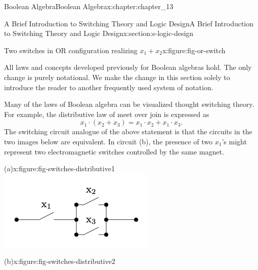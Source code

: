 \documentclass[oneside,10pt,]{book}
\numberwithin{equation}{section}
\begin{document}
\begin{chapterptx}{Boolean Algebra}{}{Boolean Algebra}{}{}{x:chapter:chapter_13}
\begin{sectionptx}{A Brief Introduction to Switching Theory and Logic Design}{}{A Brief Introduction to Switching Theory and Logic Design}{}{}{x:section:s-logic-design}
\begin{sidebyside}{2}{0}{0}{0}
\begin{sbspanel}{0.5}
\begin{figureptx}{Two switches in OR configuration realizing \(x_1 + x_2\)}{x:figure:fig-or-switch}{}
\tcblower
\end{figureptx}%
\end{sbspanel}%
\end{sidebyside}%
\par
All laws and concepts developed previously for Boolean algebras hold. The only change is purely notational. We make the change in this section solely to introduce the reader to another frequently used system of notation.%
\par
Many of the laws of Boolean algebra can be visualized thought switching theory. For example, the distributive law of meet over join is expressed as%
\begin{equation*}
x_1 \cdot \left(x_2+ x_3\right) = x_1 \cdot  x_2+x_1 \cdot  x_3.
\end{equation*}
The switching circuit analogue of the above statement is that the circuits in the two images below are equivalent.  In circuit (b), the presence of two \(x_1\)'s might represent two electromagnetic switches controlled by the same magnet.%
\begin{sidebyside}{2}{0}{0}{0}%
\begin{sbspanel}{0.5}%
\begin{figureptx}{(a)}{x:figure:fig-switches-distributive1}{}%
\includegraphics[width=\linewidth]{images/fig-switches-distributive1.png}
\tcblower
\end{figureptx}%
\end{sbspanel}%
\begin{sbspanel}{0.5}%
\begin{figureptx}{(b)}{x:figure:fig-switches-distributive2}{}%

\end{figureptx}
\end{sbspanel}
\end{sidebyside}
\end{sectionptx}
\end{chapterptx}
\end{document}
